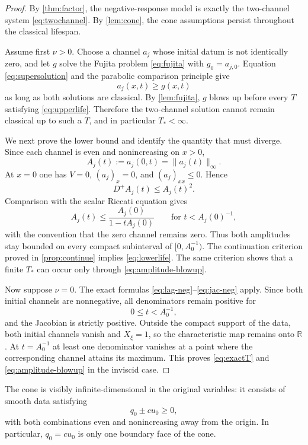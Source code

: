 \documentclass[11pt]{article}
\theoremstyle{definition}
\newcommand{\R}{\mathbb R}
\begin{document}
\begin{proof}
By \cref{thm:factor}, the negative-response model is exactly the two-channel system \eqref{eq:twochannel}.  By \cref{lem:cone}, the cone assumptions persist throughout the classical lifespan.

Assume first $\nu>0$.  Choose a channel $a_j$ whose initial datum is not identically zero, and let $g$ solve the Fujita problem \eqref{eq:fujita} with $g_0=a_{j,0}$.  Equation \eqref{eq:supersolution} and the parabolic comparison principle give
\[
 a_j(x,t)\ge g(x,t)
\]
as long as both solutions are classical.  By \cref{lem:fujita}, $g$ blows up before every $T$ satisfying \eqref{eq:upperlife}.  Therefore the two-channel solution cannot remain classical up to such a $T$, and in particular $T_*<\infty$.

We next prove the lower bound and identify the quantity that must diverge.  Since each channel is even and nonincreasing on $x>0$,
\[
 A_j(t):=a_j(0,t)=\|a_j(t)\|_\infty.
\]
At $x=0$ one has $V=0$, $(a_j)_x=0$, and $(a_j)_{xx}\le0$.  Hence
\[
 D^+A_j(t)\le A_j(t)^2.
\]
Comparison with the scalar Riccati equation gives
\begin{equation}\label{eq:center-upper}
 A_j(t)\le\frac{A_j(0)}{1-tA_j(0)}
 \qquad\text{for }t<A_j(0)^{-1},
\end{equation}
with the convention that the zero channel remains zero.  Thus both amplitudes stay bounded on every compact subinterval of $[0,A_0^{-1})$.  The continuation criterion proved in \cref{prop:continue} implies \eqref{eq:lowerlife}.  The same criterion shows that a finite $T_*$ can occur only through \eqref{eq:amplitude-blowup}.

Now suppose $\nu=0$.  The exact formulas \eqref{eq:lag-neg}--\eqref{eq:jac-neg} apply.  Since both initial channels are nonnegative, all denominators remain positive for
\[
 0\le t<A_0^{-1},
\]
and the Jacobian is strictly positive.  Outside the compact support of the data, both initial channels vanish and $X_\xi=1$, so the characteristic map remains onto $\R$.  At $t=A_0^{-1}$ at least one denominator vanishes at a point where the corresponding channel attains its maximum.  This proves \eqref{eq:exactT} and \eqref{eq:amplitude-blowup} in the inviscid case.
\end{proof}

The cone is visibly infinite-dimensional in the original variables: it consists of smooth data satisfying
\[
 q_0\pm cu_0\ge0,
\]
with both combinations even and nonincreasing away from the origin.  In particular, $q_0=cu_0$ is only one boundary face of the cone.
\end{document}
